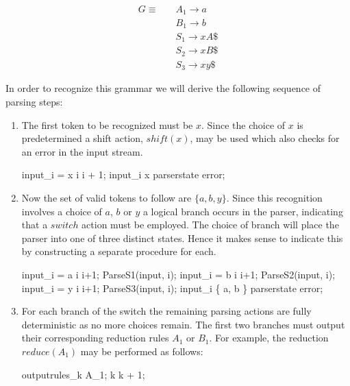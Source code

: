 \documentclass[a4paper,11pt]{article}
\begin{document}
\begin{align*}
G \equiv \quad & A_1 \rightarrow a\\
               & B_1 \rightarrow b\\
               & S_1 \rightarrow x A \$\\
               & S_2 \rightarrow x B \$\\
               & S_3 \rightarrow x y \$
\end{align*}

In order to recognize this grammar we will derive the following sequence of parsing steps:
\begin{enumerate}
\item The first token to be recognized must be $x$. Since the choice of $x$ is predetermined a shift action, $shift(x)$, may be used which also checks for an error in the input stream.
\begin{center}
\begin{gcl}
\IF input_i = x \rightarrow i \becomes i + 1;
\BAR input_i \neq x \rightarrow parserstate \becomes error;
\FI
\end{gcl}
\end{center}

\item Now the set of valid tokens to follow are $\{ a, b, y \}$. 
Since this recognition involves a choice of $a$, $b$ or $y$ a logical branch occurs in the parser, indicating that a $switch$ action must be employed.
The choice of branch will place the parser into one of three distinct states. Hence it makes sense to indicate this by constructing a separate procedure for each.
\begin{center}
\begin{gcl}
\IF input_i = a \rightarrow 
                \qquad i \becomes i+1; 
                \qquad ParseS1(input, i);
\BAR input_i = b \rightarrow 
                \qquad i \becomes i+1;
                \qquad ParseS2(input, i);
\BAR input_i = y \rightarrow 
                \qquad i \becomes i+1; 
                \qquad ParseS3(input, i);
\BAR input_i \notin \{ a, b \} \rightarrow 
                \qquad parserstate \becomes error;
\FI
\end{gcl}
\end{center}

\item For each branch of the switch the remaining parsing actions are fully deterministic as no more choices remain.
The first two branches must output their corresponding reduction rules $A_1$ or $B_1$. 
For example, the reduction $reduce(A_1)$ may be performed as follows:
\begin{center}
\begin{gcl}
outputrules_k \becomes A_1;
k \becomes k + 1;
\end{gcl}
\end{center}


\end{enumerate}
\end{document}
